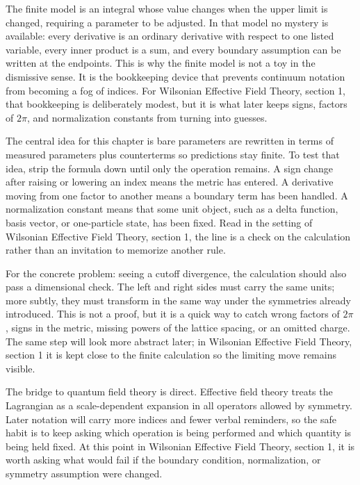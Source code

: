 The finite model is an integral whose value changes when the upper limit is changed, requiring a parameter to be adjusted.  In that model no mystery is available: every derivative is an ordinary derivative with respect to one listed variable, every inner product is a sum, and every boundary assumption can be written at the endpoints.  This is why the finite model is not a toy in the dismissive sense.  It is the bookkeeping device that prevents continuum notation from becoming a fog of indices.  For Wilsonian Effective Field Theory, section 1, that bookkeeping is deliberately modest, but it is what later keeps signs, factors of \(2\pi\), and normalization constants from turning into guesses.

The central idea for this chapter is bare parameters are rewritten in terms of measured parameters plus counterterms so predictions stay finite.  To test that idea, strip the formula down until only the operation remains.  A sign change after raising or lowering an index means the metric has entered.  A derivative moving from one factor to another means a boundary term has been handled.  A normalization constant means that some unit object, such as a delta function, basis vector, or one-particle state, has been fixed.  Read in the setting of Wilsonian Effective Field Theory, section 1, the line is a check on the calculation rather than an invitation to memorize another rule.

For the concrete problem: seeing a cutoff divergence, the calculation should also pass a dimensional check.  The left and right sides must carry the same units; more subtly, they must transform in the same way under the symmetries already introduced.  This is not a proof, but it is a quick way to catch wrong factors of \(2\pi\), signs in the metric, missing powers of the lattice spacing, or an omitted charge.  The same step will look more abstract later; in Wilsonian Effective Field Theory, section 1 it is kept close to the finite calculation so the limiting move remains visible.

The bridge to quantum field theory is direct.  Effective field theory treats the Lagrangian as a scale-dependent expansion in all operators allowed by symmetry.  Later notation will carry more indices and fewer verbal reminders, so the safe habit is to keep asking which operation is being performed and which quantity is being held fixed.  At this point in Wilsonian Effective Field Theory, section 1, it is worth asking what would fail if the boundary condition, normalization, or symmetry assumption were changed.

